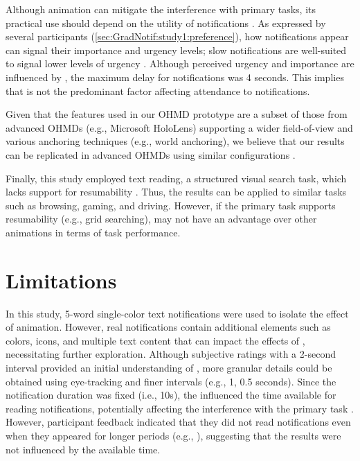 Although \fading{} animation can mitigate the interference with primary tasks, its practical use should depend on the utility of notifications \cite{mccrickard_attuning_2003, gluck_matching_2007}. As expressed by several participants (\autoref{sec:GradNotif:study1:preference}), how notifications appear can signal their importance and urgency levels; slow \fading{} notifications are well-suited to signal lower levels of urgency \cite{faulhaber_priority_dependent_2022}. Although perceived urgency and importance are influenced by \fadeduration{}, the maximum delay for notifications was 4 seconds. This implies that \fadeduration{} is not the predominant factor affecting attendance to notifications.

Given that the features used in our OHMD prototype are a subset of those from advanced OHMDs (e.g., Microsoft HoloLens) supporting a wider field-of-view and various anchoring techniques (e.g., world anchoring), we believe that our results can be replicated in advanced OHMDs using similar configurations \cite{janaka_can_2023}.

Finally, this study employed text reading, a structured visual search task, which lacks support for resumability \cite{smith_visual_2015}. Thus, the results can be applied to similar tasks such as browsing, gaming, and driving. However, if the primary task supports resumability (e.g., grid searching), \fading{} may not have an advantage over other animations in terms of task performance.







\section{Limitations}
\label{sec:GradNotif:limitations}

In this study, 5-word single-color text notifications were used to isolate the effect of animation. However, real notifications contain additional elements such as colors, icons, and multiple text content \cite{android_android_2021} that can impact the effects of \fading{} \cite{luyten_hidden_2016, bailey_effects_2001}, necessitating further exploration. 
Although subjective ratings with a 2-second interval provided an initial understanding of \fadeduration{}, more granular details could be obtained using eye-tracking and finer intervals (e.g., 1, 0.5 seconds). 
Since the notification duration was fixed (i.e., 10s), the \fadeduration{} influenced the time available for reading notifications, potentially affecting the interference with the primary task \cite{monk_effect_2008}. 
However, participant feedback indicated that they did not read notifications even when they appeared for longer periods (e.g., \instant{}), suggesting that the results were not influenced by the available time.


